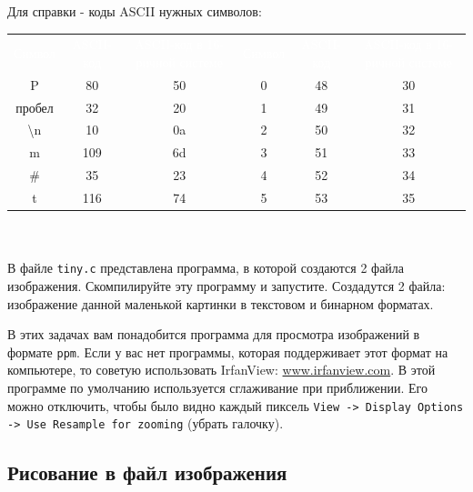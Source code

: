 \documentclass{article}
\begin{document}
Для справки - коды ASCII нужных символов:\\
\begin{tabular}{ccc | ccc} 
\rowcolor[rgb]{0,0.173,0.3255}
\textcolor{white}{Символ}\quad&\textcolor{white}{ASCII-код}\quad&\textcolor{white}{ASCII-код в 16-ричной системе}&
\textcolor{white}{Символ}\quad&\textcolor{white}{ASCII-код}\quad&\textcolor{white}{ASCII-код в 16-ричной системе}
\\ 
\rowcolor[rgb]{0.89451,0.93588,0.97078} 
P                & 80 & 50       &         0  & 48 & 30 \\
пробел           & 32 & 20       &         1  & 49 & 31  \\
\textbackslash n & 10 & 0a       &         2  & 50 & 32  \\
m                & 109& 6d       &         3  & 51 & 33  \\
\#               & 35 & 23       &         4  & 52 & 34  \\
t                & 116 & 74      &         5  & 53 & 35 
\end{tabular}\\
\\
В файле \texttt{tiny.c} представлена программа, в которой создаются 2 файла изображения. Скомпилируйте эту программу и запустите. Создадутся 2 файла: изображение данной маленькой картинки в текстовом и бинарном форматах.

\newpage

В этих задачах вам понадобится программа для просмотра изображений в формате \texttt{ppm}. Если у вас нет программы, которая поддерживает этот  формат на компьютере, то советую использовать IrfanView: \href{https://www.irfanview.com/}{www.irfanview.com}.
В этой программе по умолчанию используется сглаживание при приближении. Его можно отключить, чтобы было видно каждый пиксель \texttt{View -> Display Options -> Use Resample for zooming} (убрать галочку).
\subsection*{Рисование в файл изображения}
\end{document}

